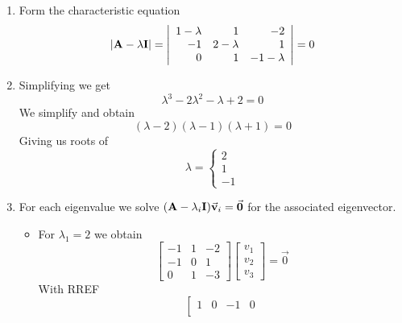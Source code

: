         \begin{enumerate}
            \item Form the characteristic equation
                \[
                    \lvert \mathbf{A} - \lambda \mathbf{I} \rvert = 
                    \left| \begin{array}{rrr}
                        1 - \lambda & 1 & -2\\
                        -1 & 2 - \lambda & 1\\
                        0 & 1 & -1 - \lambda
                    \end{array} \right|  = 0 \]
            \item Simplifying we get
                \[ \lambda^3 - 2 \lambda^2 - \lambda + 2 = 0 \]
                We simplify and obtain
                \[ (\lambda - 2)(\lambda - 1)(\lambda + 1) = 0 \]
                Giving us roots of
                \[ \boxed{\lambda = \begin{cases}
                    2\\
                    1\\
                    -1
                \end{cases} } \]
            \item For each eigenvalue we solve $( \ma - \lambda_i \mathbf{I}) \vec{v}_i = \vec{0}$ for the associated eigenvector.
                \begin{itemize}
                    \item For $\lambda_1 = 2$ we obtain
                        \[
                            \left[ \begin{array}{rrr}
                                -1 & 1 & -2\\
                                -1 & 0 & 1\\
                                0 & 1 & -3
                            \end{array} \right]
                            \left[ \begin{array}{r}
                                v_1\\ v_2\\ v_3
                            \end{array} \right]
                            = \vec{0}
                        \]
                        With RREF
                        \[
                            \left[ \begin{array}{rrr|r}
                                1 & 0 & -1 & 0\\

\end{array}\]
\end{itemize}
\end{enumerate}
